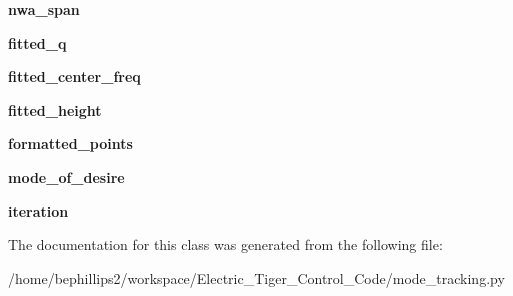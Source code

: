 \begin{DoxyCompactItemize}
\item 
\hypertarget{classmode__tracking_1_1_mode_track_body_a47888f0f588e6ccd52d077b9775f9ca6}{{\bfseries nwa\-\_\-span}}\label{classmode__tracking_1_1_mode_track_body_a47888f0f588e6ccd52d077b9775f9ca6}

\item 
\hypertarget{classmode__tracking_1_1_mode_track_body_a65be50c6c31cb99e0187d89f53f9938b}{{\bfseries fitted\-\_\-q}}\label{classmode__tracking_1_1_mode_track_body_a65be50c6c31cb99e0187d89f53f9938b}

\item 
\hypertarget{classmode__tracking_1_1_mode_track_body_a14e392077e43233fa9d9aff80a52dcde}{{\bfseries fitted\-\_\-center\-\_\-freq}}\label{classmode__tracking_1_1_mode_track_body_a14e392077e43233fa9d9aff80a52dcde}

\item 
\hypertarget{classmode__tracking_1_1_mode_track_body_ad521e295cec5960c2f3e5535bd9e66cb}{{\bfseries fitted\-\_\-height}}\label{classmode__tracking_1_1_mode_track_body_ad521e295cec5960c2f3e5535bd9e66cb}

\item 
\hypertarget{classmode__tracking_1_1_mode_track_body_a5eab268d1cd84e9735d3db2220862ed4}{{\bfseries formatted\-\_\-points}}\label{classmode__tracking_1_1_mode_track_body_a5eab268d1cd84e9735d3db2220862ed4}

\item 
\hypertarget{classmode__tracking_1_1_mode_track_body_ab4fd3beb35ac328d11f378e4fdfe7942}{{\bfseries mode\-\_\-of\-\_\-desire}}\label{classmode__tracking_1_1_mode_track_body_ab4fd3beb35ac328d11f378e4fdfe7942}

\item 
\hypertarget{classmode__tracking_1_1_mode_track_body_a03670827ec064055a8ecdb486a6cce55}{{\bfseries iteration}}\label{classmode__tracking_1_1_mode_track_body_a03670827ec064055a8ecdb486a6cce55}

\end{DoxyCompactItemize}


The documentation for this class was generated from the following file\-:\begin{DoxyCompactItemize}
\item 
/home/bephillips2/workspace/\-Electric\-\_\-\-Tiger\-\_\-\-Control\-\_\-\-Code/mode\-\_\-tracking.\-py\end{DoxyCompactItemize}
